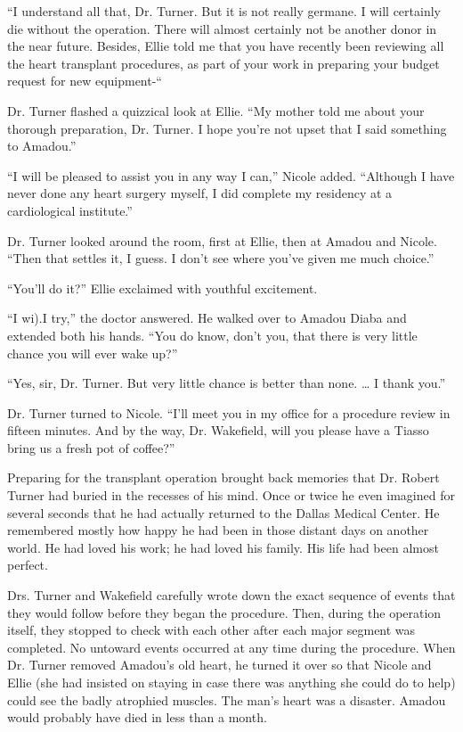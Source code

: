 \documentclass[]{article}
\begin{document}
{“I understand all that, Dr. Turner. But it is not really germane. I will certainly die without the operation. There will almost certainly not be another donor in the near future. Besides, Ellie told me that you have recently been reviewing all the heart transplant procedures, as part of your work in preparing your budget request for new equipment-“

Dr. Turner flashed a quizzical look at Ellie. “My mother told me about your thorough preparation, Dr. Turner. I hope you’re not upset that I said something to Amadou.”

“I will be pleased to assist you in any way I can,” Nicole added. “Although I have never done any heart surgery myself, I did complete my residency at a cardiological institute.”

Dr. Turner looked around the room, first at Ellie, then at Amadou and Nicole. “Then that settles it, I guess. I don’t see where you’ve given me much choice.”

“You’ll do it?” Ellie exclaimed with youthful excitement.

“I wi).I try,” the doctor answered. He walked over to Amadou Diaba and extended both his hands. “You do know, don’t you, that there is very little chance you will ever wake up?”

“Yes, sir, Dr. Turner. But very little chance is better than none. … I thank you.”

Dr. Turner turned to Nicole. “I’ll meet you in my office for a procedure review in fifteen minutes. And by the way, Dr. Wakefield, will you please have a Tiasso bring us a fresh pot of coffee?”

Preparing for the transplant operation brought back memories that Dr. Robert Turner had buried in the recesses of his mind. Once or twice he even imagined for several seconds that he had actually returned to the Dallas Medical Center. He remembered mostly how happy he had been in those distant days on another world. He had loved his work; he had loved his family. His life had been almost perfect.

Drs. Turner and Wakefield carefully wrote down the exact sequence of events that they would follow before they began the procedure. Then, during the operation itself, they stopped to check with each other after each major segment was completed. No untoward events occurred at any time during the procedure. When Dr. Turner removed Amadou’s old heart, he turned it over so that Nicole and Ellie (she had insisted on staying in case there was anything she could do to help) could see the badly atrophied muscles. The man’s heart was a disaster. Amadou would probably have died in less than a month.

}
\end{document}
